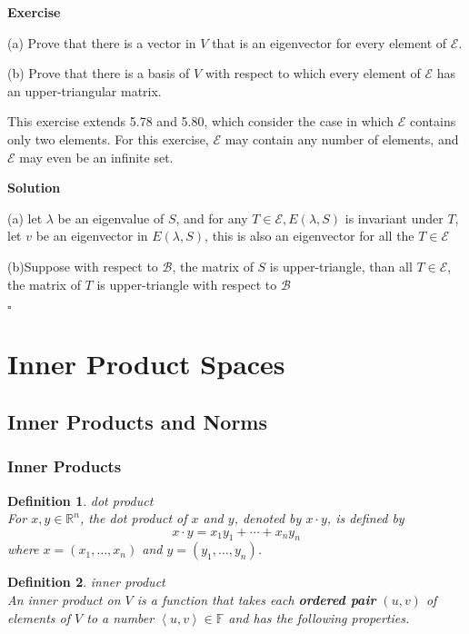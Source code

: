 \documentclass{article}
\newtheorem{definition}{Definition}[subsection]
\newenvironment{exercise}{%
{\textbf{Exercise\\}
    }
}{
}
\newenvironment{solution}{%
{
    \textbf{Solution\\}
    }
}{
  \hfill $\square$ 
  \par\bigskip 
}
\newcommand{\RR}{\mathbb{R}}
\newcommand{\FF}{\mathbb{F}}
\begin{document}
\begin{CJK}{UTF8}{gkai}
\begin{exercise}
    (a) Prove that there is a vector in $V$ that is an eigenvector for every element of $\mathcal{E}$.

    (b) Prove that there is a basis of $V$ with respect to which every element of $\mathcal{E}$ has an upper-triangular matrix.

    This exercise extends 5.78 and 5.80, which consider the case in which $\mathcal{E}$ contains only two elements. For this exercise, $\mathcal{E}$ may contain any number of elements, and $\mathcal{E}$ may even be an infinite set.
\end{exercise}

\begin{solution}
    (a) let $\lambda$ be an eigenvalue of $S$, and for any $T \in \mathcal{E}, E(\lambda,S)$ is invariant under $T$, let $v$ be an eigenvector in $E(\lambda,S)$, this is also an eigenvector for all the $T \in \mathcal{E}$

    (b)Suppose with respect to $\mathcal{B}$, the matrix of $S$ is upper-triangle, than all $T \in \mathcal{E}$, the matrix of $T$ is upper-triangle with respect to $\mathcal{B}$ 
\end{solution}


\section{Inner Product Spaces}

\subsection{Inner Products and Norms}

\subsubsection{Inner Products}

\begin{definition}
    dot product\\

    For $x,y \in \RR^n$, the dot product of $x$ and $y$, denoted by $x \cdot y$, is defined by
    \[x \cdot y = x_1y_1 +\cdots+x_n y_n\]
    where $x = (x_1,\ldots,x_n)$ and $y = (y_1,\ldots,y_n)$.
\end{definition}

\begin{definition}
    inner product\\

    An inner product on $V$ is a function that takes each \textbf{ordered pair} $(u,v)$ of elements of $V$ to a number $\left<u,v\right> \in \FF$ and has the following properties.


\end{definition}
\end{CJK}
\end{document}
